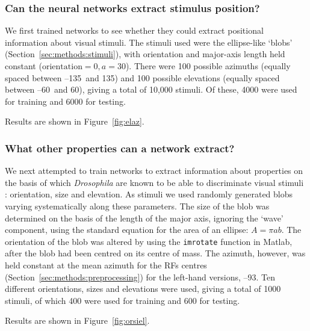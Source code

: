 \subsubsection{Can the neural networks extract stimulus position?}
We first trained networks to see whether they could extract positional information about visual stimuli.
The stimuli used were the ellipse-like `blobs' (Section~\ref{sec:methods:stimuli}), with orientation and major-axis length held constant ($\mathrm{orientation} = 0, a = 30$).
There were 100 possible azimuths (equally spaced between --135\degree\ and 135\degree) and 100 possible elevations (equally spaced between --60\degree\ and 60\degree), giving a total of 10,000 stimuli.
Of these, 4000 were used for training and 6000 for testing.

Results are shown in Figure~\ref{fig:elaz}.

\subsubsection{What other properties can a network extract?}
We next attempted to train networks to extract information about properties on the basis of which \emph{Drosophila} are known to be able to discriminate visual stimuli \cite{Liu2006}: orientation, size and elevation.
As stimuli we used randomly generated blobs varying systematically along these parameters.
The size of the blob was determined on the basis of the length of the major axis, ignoring the `wave' component, using the standard equation for the area of an ellipse: $A = \pi ab$.
The orientation of the blob was altered by using the \texttt{imrotate} function in Matlab, after the blob had been centred on its centre of mass.
The azimuth, however, was held constant at the mean azimuth for the RFs centres (Section~\ref{sec:methods:preprocessing}) for the left-hand versions, --93\degree.
Ten different orientations, sizes and elevations were used, giving a total of 1000 stimuli, of which 400 were used for training and 600 for testing.

Results are shown in Figure~\ref{fig:orsiel}.

